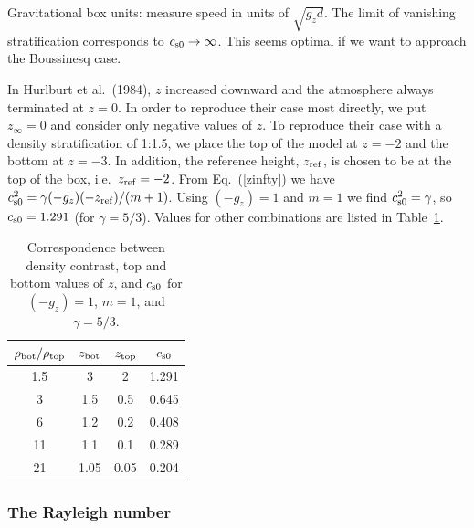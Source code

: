 \documentclass[\mydriver,12pt,twoside,notitlepage,a4paper]{article}
\begin{document}
Gravitational box units: measure speed in units of $\sqrt{g_z d}$.
The limit of vanishing stratification corresponds to
$c_{\rm s0}\rightarrow\infty$. This seems optimal if we want
to approach the Boussinesq case.

In Hurlburt et al.\ (1984), $z$ increased downward and the atmosphere
always terminated at $z=0$. In order to reproduce their case most
directly, we put $z_\infty=0$ and consider only negative values of $z$.
To reproduce their case with a density stratification of 1:1.5, we place
the top of the model at $z=-2$ and the bottom at $z=-3$. In addition,
the reference height, $z_{\rm ref}$, is chosen to be at the top of the
box, i.e.\ $z_{\rm ref}=-2$. From Eq.~(\ref{zinfty}) we have
$c_{\rm s0}^2=\gamma(-g_z)(-z_{\rm ref})/(m+1)$. Using $(-g_z)=1$
and $m=1$ we find $c_{\rm s0}^2=\gamma$, so $c_{\rm s0}=1.291$
(for $\gamma=5/3$). Values for other combinations are listed in
Table~\ref{Tdensitycontrast}.

\begin{table}[htb]
  \begin{center}
    \caption{
      Correspondence between density contrast, top and bottom values
      of $z$, and $c_{\rm s0}$ for $(-g_z)=1$, $m=1$, and $\gamma=5/3$.
    }
    \label{Tdensitycontrast}
    \begin{tabular}{cccc}
    \toprule
$\rho_{\rm bot}/\rho_{\rm top}$ &
$z_{\rm bot}$ & $z_{\rm top}$ & $c_{\rm s0}$ \\
    \midrule
 1.5  & 3    & 2    & 1.291 \\
 3    & 1.5  & 0.5  & 0.645 \\
 6    & 1.2  & 0.2  & 0.408 \\
 11   & 1.1  & 0.1  & 0.289 \\
 21   & 1.05 & 0.05 & 0.204 \\
    \bottomrule
    \end{tabular}
  \end{center}
\end{table}

\subsubsection{The Rayleigh number}
\end{document}
